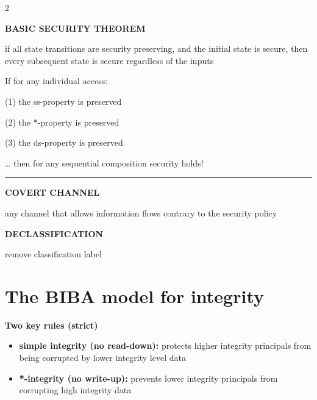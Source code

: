 \documentclass[a4paper,9pt]{extarticle}
\newcommand{\separator}{
\vspace{2pt}
\hrule
\vspace{3pt}
}
\begin{document}
\begin{multicols}{2}
\begin{important}
\textbf{BASIC SECURITY THEOREM}

if all state transitions are security preserving, and the initial state is
secure, then every subsequent state is secure regardless of the inputs

\end{important}


If for any individual access:

(1) the ss-property is preserved

(2) the *-property is preserved

(3) the ds-property is preserved

\dots{} then for any sequential composition security holds!


\separator


\begin{definition}

\textbf{COVERT CHANNEL}

any channel that allows information flows contrary to the security policy

\end{definition}


\begin{definition}

\textbf{DECLASSIFICATION}

remove classification label

\end{definition}



\section{The BIBA model for integrity}


\begin{important}

\textbf{Two key rules (strict)}

\begin{itemize}

\item \textbf{simple integrity (no read-down):} protects higher integrity principals from being corrupted
by lower integrity level data

\item \textbf{*-integrity (no write-up):} prevents lower integrity principals from corrupting high integrity
data

\end{itemize}


\end{important}
\end{multicols}
\end{document}
